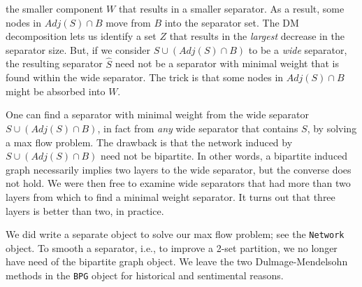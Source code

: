 the smaller component $W$ that results in a smaller separator.
As a result, some nodes in $Adj(S) \cap B$ move from $B$ into the
separator set.
The DM decomposition lets us identify a set $Z$ that results in the
{\it largest} decrease in the separator size.
But, if we consider $S \cup (Adj(S) \cap B)$ to be a {\it wide}
separator, the resulting separator ${\widehat S}$ need not be a
separator with minimal weight that is found within the wide
separator.
The trick is that some nodes in $Adj(S) \cap B$ might be absorbed
into $W$.
\par
One can find a separator with minimal weight from the wide
separator $S \cup (Adj(S) \cap B)$, in fact from {\it any} wide
separator that contains $S$, by solving a max flow problem.
The drawback is that the network induced by $S \cup (Adj(S) \cap B)$ 
need not be bipartite.
In other words, a bipartite induced graph necessarily implies two
layers to the wide separator, but the converse does not hold.
We were then free to examine wide separators that had more than two
layers from which to find a minimal weight separator.
It turns out that three layers is better than two, in practice.
\par
We did write a separate object to solve our max flow problem; 
see the {\tt Network} object.
To smooth a separator, i.e., to improve a 2-set partition,
we no longer have need of the bipartite graph object.
We leave the two Dulmage-Mendelsohn methods in the {\tt BPG} object
for historical and sentimental reasons.


